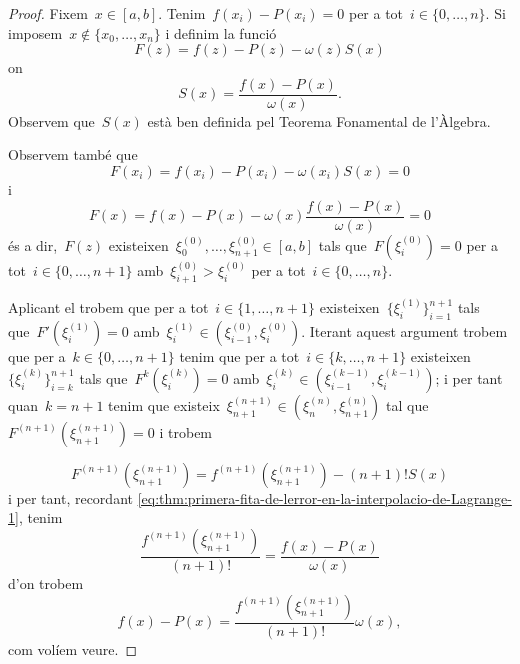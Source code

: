 \documentclass[../../main.tex]{subfiles}
\begin{document}
    \begin{proof}
        Fixem~\(x\in[a,b]\).
        Tenim~\(f(x_{i})-P(x_{i})=0\) per a tot~\(i\in\{0,\dots,n\}\).
        Si imposem~\(x\notin\{x_{0},\dots,x_{n}\}\) i definim la funció
        \[
            F(z)=f(z)-P(z)-\omega(z)S(x)
        \]
        on
        \begin{equation}\label{eq:thm:primera-fita-de-lerror-en-la-interpolacio-de-Lagrange-1}
        S(x)=\frac{f(x)-P(x)}{\omega(x)}.
        \end{equation}
        Observem que~\(S(x)\) està ben definida pel Teorema Fonamental de l'Àlgebra.

        Observem també que
        \[
            F(x_{i})=f(x_{i})-P(x_{i})-\omega(x_{i})S(x)=0
        \]
        i
        \[
            F(x)=f(x)-P(x)-\omega(x)\frac{f(x)-P(x)}{\omega(x)}=0
        \]
        és a dir,~\(F(z)\) existeixen~\(\xi^{(0)}_{0},\dots,\xi^{(0)}_{n+1}\in[a,b]\) tals que~\(F(\xi^{(0)}_{i})=0\) per a tot~\(i\in\{0,\dots,n+1\}\) amb~\(\xi^{(0)}_{i+1}>\xi^{(0)}_{i}\) per a tot~\(i\in\{0,\dots,n\}\).

        Aplicant el  trobem que per a tot~\(i\in\{1,\dots,n+1\}\) existeixen~\(\{\xi^{(1)}_{i}\}_{i=1}^{n+1}\) tals que~\(F'(\xi^{(1)}_{i})=0\) amb~\(\xi^{(1)}_{i}\in(\xi^{(0)}_{i-1},\xi^{(0)}_{i})\).
        Iterant aquest argument trobem que per a~\(k\in\{0,\dots,n+1\}\) tenim que per a tot~\(i\in\{k,\dots,n+1\}\) existeixen~\(\{\xi^{(k)}_{i}\}_{i=k}^{n+1}\) tals que~\(F^{k}(\xi^{(k)}_{i})=0\) amb~\(\xi^{(k)}_{i}\in(\xi^{(k-1)}_{i-1},\xi^{(k-1)}_{i})\); i per tant quan~\(k=n+1\) tenim que existeix~\(\xi^{(n+1)}_{n+1}\in(\xi^{(n)}_{n},\xi^{(n)}_{n+1})\) tal que~\(F^{(n+1)}(\xi^{(n+1)}_{n+1})=0\) i trobem%
            \begin{comment}
                \marginpar{Dime si es verdad\\
                Que alguien ha logrado escapar de esta tela de araña.\\
                Dime cuanto cuesta\hfil\twonotes\hfil\\
                Saber la puta verdad\\
                Y quien le pone precio.}
            \end{comment}
        \[
            F^{(n+1)}(\xi^{(n+1)}_{n+1})=f^{(n+1)}(\xi^{(n+1)}_{n+1})-(n+1)!S(x)
        \]%
        i per tant, recordant \eqref{eq:thm:primera-fita-de-lerror-en-la-interpolacio-de-Lagrange-1}, tenim
        \[
            \frac{f^{(n+1)}(\xi^{(n+1)}_{n+1})}{(n+1)!}=\frac{f(x)-P(x)}{\omega(x)}
        \]
        d'on trobem
        \[
            f(x)-P(x)=\frac{f^{(n+1)}(\xi^{(n+1)}_{n+1})}{(n+1)!}\omega(x),
        \]
        com volíem veure.
    \end{proof}
\end{document}
